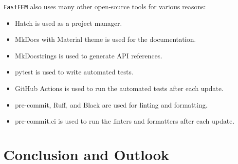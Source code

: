 \documentclass[headings=standardclasses, abstract=true]{scrartcl}
\begin{document}
\texttt{FastFEM} also uses many other open-source tools for various reasons:
\begin{itemize}
    \item Hatch\supercite{hatch} is used as a project manager.
    \item MkDocs\supercite{mkdocs} with Material theme\supercite{mkdocsmaterial} is used for the documentation.
    \item MkDocstrings\supercite{mkdocstrings} is used to generate API references.
    \item pytest\supercite{pytest} is used to write automated tests.
    \item GitHub Actions\supercite{githubactions} is used to run the automated tests after each update.
    \item pre-commit\supercite{precommit}, Ruff\supercite{ruff}, and Black\supercite{black} are used for linting and formatting.
    \item pre-commit.ci is used to run the linters and formatters after each update.
\end{itemize}

\section{Conclusion and Outlook}

\clearpage
\printbibliography
\end{document}
